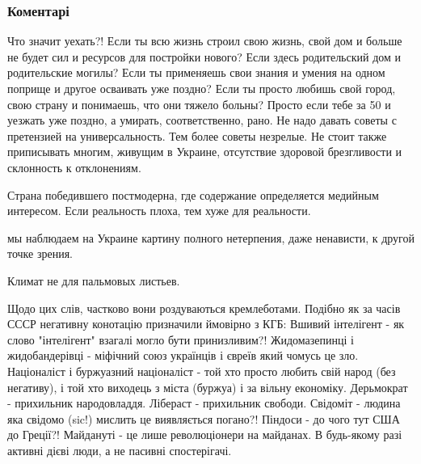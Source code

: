  
 
 
 
 
\subsubsection{Коментарі}
\label{sec:02_07_2018.fb.lesev_igor.1.o_patriotizme.cmt}

\begin{itemize} %

Что значит уехать?! Если ты всю жизнь строил свою жизнь, свой дом и больше не
будет сил и ресурсов для постройки нового? Если здесь родительский дом и
родительские могилы? Если ты применяешь свои знания и умения на одном поприще и
другое осваивать уже поздно? Если ты просто любишь свой город, свою страну и
понимаешь, что они тяжело больны? Просто если тебе за 50 и уезжать уже поздно,
а умирать, соответственно, рано. Не надо давать советы с претензией на
универсальность. Тем более советы незрелые. Не стоит также приписывать многим,
живущим в Украине, отсутствие здоровой брезгливости и склонность к отклонениям.

Страна победившего постмодерна, где содержание определяется медийным интересом. Если реальность плоха, тем хуже для реальности.

мы наблюдаем на Украине картину полного нетерпения, даже ненависти, к другой точке зрения.

Климат не для пальмовых листьев.


\obeycr
Щодо цих слів, частково вони роздуваються кремлеботами.
Подібно як за часів СССР негативну конотацію призначили ймовірно з КГБ:
Вшивий інтелігент - як слово "інтелігент" взагалі могло бути принизливим?!
Жидомазепинці і жидобандерівці - міфічний союз українців і євреїв який чомусь це зло.
Націоналіст і буржуазний націоналіст - той хто просто любить свій народ (без негативу), і той хто виходець з міста (буржуа) і за вільну економіку.
Дерьмократ - прихильник народовладдя.
Лібераст - прихильник свободи.
Свідоміт - людина яка свідомо (sic!) мислить це виявляється погано?!
Піндоси - до чого тут США до Греції?!
Майдануті - це лише революціонери на майданах. В будь-якому разі активні дієві люди, а не пасивні спостерігачі.
\restorecr


\end{itemize}
